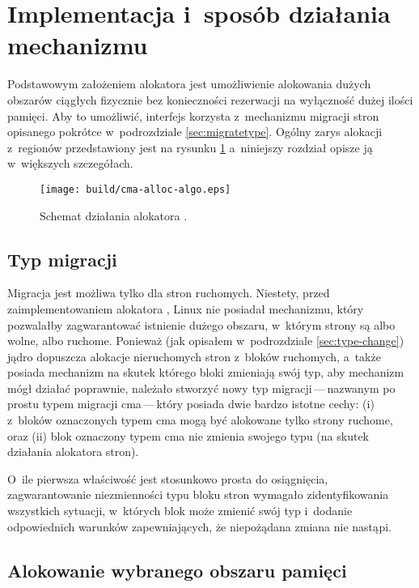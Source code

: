 \section{Implementacja i~sposób działania mechanizmu }

Podstawowym założeniem alokatora  jest umożliwienie alokowania
dużych obszarów ciągłych fizycznie bez konieczności rezerwacji na
wyłączność dużej ilości pamięci.  Aby to umożliwić, interfejs 
korzysta z~mechanizmu migracji stron opisanego pokrótce w~podrozdziale
\ref{sec:migratetype}.  Ogólny zarys alokacji z~regionów 
przedstawiony jest na rysunku \ref{fig:cma-alloc-algo} a~niniejszy
rozdział opisze ją w~większych szczegółach.

\begin{figure}[tbp]
  \texttt{[image: build/cma-alloc-algo.eps]}
  \caption{Schemat działania alokatora .}
  \label{fig:cma-alloc-algo}
\end{figure}


\subsection{Typ migracji }\label{sec:migrate-cma}

Migracja jest możliwa tylko dla stron ruchomych.  Niestety, przed
zaimplementowaniem alokatora , Linux nie posiadał mechanizmu,
który pozwalałby zagwarantować istnienie dużego obszaru, w~którym
strony są albo wolne, albo ruchome.  Ponieważ (jak opisałem
w~podrozdziale \ref{sec:type-change}) jądro dopuszcza alokacje
nieruchomych stron z~bloków ruchomych, a~także posiada mechanizm na
skutek którego bloki zmieniają swój typ, aby mechanizm  mógł
działać poprawnie, należało stworzyć nowy typ migracji\,---\,nazwanym
po prostu typem migracji cma\,---\,który posiada dwie bardzo istotne
cechy: (i) z~bloków oznaczonych typem cma mogą być alokowane tylko
strony ruchome, oraz (ii) blok oznaczony typem cma nie zmienia swojego
typu (na skutek działania alokatora stron).

O~ile pierwsza właściwość jest stosunkowo prosta do osiągnięcia,
zagwarantowanie niezmienności typu bloku stron wymagało
zidentyfikowania wszystkich sytuacji, w~których blok może zmienić swój
typ i~dodanie odpowiednich warunków zapewniających, że niepożądana
zmiana nie nastąpi.

\subsection{Alokowanie wybranego obszaru pamięci}\label{sec:alloc-contig-range}

